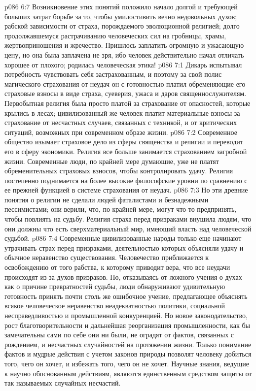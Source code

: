 \vs p086 6:7 Возникновение этих понятий положило начало долгой и требующей больших затрат борьбе за то, чтобы умилостивить вечно недовольных духов; рабской зависимости от страха, порождаемого эволюционной религией; долго продолжавшемуся растрачиванию человеческих сил на гробницы, храмы, жертвоприношения и жречество. Пришлось заплатить огромную и ужасающую цену, но она была заплачена не зря, ибо человек действительно начал отличать хорошее от плохого; родилась человеческая этика!
\vs p086 7:1 Дикарь испытывал потребность чувствовать себя застрахованным, и поэтому за свой полис магического страхования от неудач он с готовностью платил обременяющие его страховые взносы в виде страха, суеверия, ужаса и даров священнослужителям. Первобытная религия была просто платой за страхование от опасностей, которые крылись в лесах; цивилизованный же человек платит материальные взносы за страхование от несчастных случаев, связанных с техникой, и от критических ситуаций, возможных при современном образе жизни.
\vs p086 7:2 Современное общество изымает страховое дело из сферы священства и религии и переводит его в сферу экономики. Религия все больше занимается страхованием загробной жизни. Современные люди, по крайней мере думающие, уже не платят обременительных страховых взносов, чтобы контролировать удачу. Религия постепенно поднимается на более высокие философские уровни по сравнению с ее прежней функцией в системе страхования от неудач.
\vs p086 7:3 Но эти древние понятия о религии не сделали людей фаталистами и безнадежными пессимистами; они верили, что, по крайней мере, могут что\hyp{}то предпринять, чтобы повлиять на судьбу. Религия страха перед призраками внушила людям, что они должны  что есть сверхматериальный мир, имеющий власть над человеческой судьбой.
\vs p086 7:4 Современные цивилизованные народы только еще начинают утрачивать страх перед призраками, деятельностью которых объясняли удачу и обычное неравенство существования. Человечество приближается к освобождению от того рабства, к которому приводит вера, что все неудачи происходят из\hyp{}за духов\hyp{}призраков. Но, отказываясь от ложного учения о духах как о причине превратностей судьбы, люди обнаруживают удивительную готовность принять почти столь же ошибочное учение, предлагающее объяснять всякое человеческое неравенство неадекватностью политики, социальной несправедливостью и промышленной конкуренцией. Но новое законодательство, рост благотворительности и дальнейшая реорганизация промышленности, как бы замечательны сами по себе они ни были, не оградят от фактов, связанных с рождением, и несчастных случайностей на протяжении жизни. Только понимание фактов и мудрые действия с учетом законов природы позволят человеку добиться того, чего он хочет, и избежать того, чего он не хочет. Научные знания, ведущие к научно обоснованным действиям, являются единственным средством защиты от так называемых случайных несчастий.

